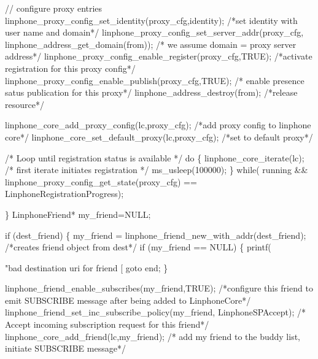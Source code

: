 \begin{DoxyCodeInclude}
{{{{                \textcolor{comment}{// configure proxy entries}
                linphone_proxy_config_set_identity(proxy\_cfg,identity); \textcolor{comment}{/*set identity with user name and
       domain*/}
                linphone_proxy_config_set_server_addr(proxy\_cfg,
      linphone_address_get_domain(from)); \textcolor{comment}{/* we assume domain = proxy server address*/}
                linphone_proxy_config_enable_register(proxy\_cfg,TRUE); \textcolor{comment}{/*activate registration for this
       proxy config*/}
                linphone_proxy_config_enable_publish(proxy\_cfg,TRUE); \textcolor{comment}{/* enable presence satus publication
       for this proxy*/}
                linphone_address_destroy(from); \textcolor{comment}{/*release resource*/}

                linphone_core_add_proxy_config(lc,proxy\_cfg); \textcolor{comment}{/*add proxy config to linphone core*/}
                linphone_core_set_default_proxy(lc,proxy\_cfg); \textcolor{comment}{/*set to default proxy*/}


                \textcolor{comment}{/* Loop until registration status is available */}
                \textcolor{keywordflow}{do} \{
                        linphone_core_iterate(lc); \textcolor{comment}{/* first iterate initiates registration */}
                        ms\_usleep(100000);
                \}
                \textcolor{keywordflow}{while}(  running && linphone\_proxy\_config\_get\_state(proxy\_cfg) == 
      LinphoneRegistrationProgress);

        \}
        LinphoneFriend* my\_friend=NULL;

        \textcolor{keywordflow}{if} (dest\_friend) \{
                my\_friend = linphone_friend_new_with_addr(dest\_friend); \textcolor{comment}{/*creates friend object from dest*/}
                \textcolor{keywordflow}{if} (my\_friend == NULL) \{
                        printf(\textcolor{stringliteral}{"bad destination uri for friend [%
                        \textcolor{keywordflow}{goto} end;
                \}

                linphone_friend_enable_subscribes(my\_friend,TRUE); \textcolor{comment}{/*configure this friend to emit
       SUBSCRIBE message after being added to LinphoneCore*/}
                linphone_friend_set_inc_subscribe_policy(my\_friend,
      LinphoneSPAccept); \textcolor{comment}{/* Accept incoming subscription request for this friend*/}
                linphone_core_add_friend(lc,my\_friend); \textcolor{comment}{/* add my friend to the buddy list, initiate
       SUBSCRIBE message*/}

}}}}}
\end{DoxyCodeInclude}
